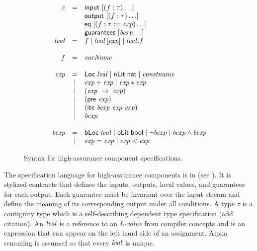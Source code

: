 \begin{figure}
  \[
    \begin{array}{rcl}
      \mathit{c}    & = & \konst{input}\ [(f : \tau)\ldots] \\
                    &   & \konst{output}\ [(f : \tau)\ldots] \\
                    &   & \konst{eq}\; [(f : \tau := \mathit{exp})\ldots] \\
                    &   & \konst{guarantees}\ [\mathit{bexp}\ldots]\\
      
      \lval & = & f \mid \lval \, [ \mathit{exp} ]
                          \mid \lval . f \\ \\

      f             & = & \mathit{varName} \\ \\

      \mathit{exp}  & = & \konst{Loc}\; \lval
                          \mid \konst{nLit}\; \konst{nat}
                          \mid \mathit{constname} \\
                    & | & \mathit{exp} + \mathit{exp}
                          \mid \mathit{exp} * \mathit{exp} \\
                    & | & (\mathit{exp}\ \rightarrow\ \mathit{exp}) \\
                    & | & (\konst{pre}\ \mathit{exp}) \\
                    & | & (\konst{ite}\ \mathit{bexp}\ \mathit{exp}\ \mathit{exp})\\
                    & | & \mathit{bexp} \\ \\
                          
      \mathit{bexp} & = & \konst{bLoc}\; \lval
                          \mid  \konst{bLit}\; \konst{bool}
                          \mid  \neg \mathit{bexp}
                          \mid  \mathit{bexp} \land \mathit{bexp} \\
                    & | & \mathit{exp} = \mathit{exp} 
                    \mid  \mathit{exp} < \mathit{exp}
\end{array}
\]
\caption{Syntax for high-assurance component specifications.}
\label{fig:syntax}
\end{figure}

The specification language for high-assurance components is in (see ). It is stylized contracts that defines the inputs, outputs, local values, and guarantees for each output. Each guarantee must be invariant over the input stream and define the meaning of its corresponding output under all conditions. A type $\tau$ is a contiguity type which is a self-describing dependent type specification (add citation). An $\mathit{lval}$ is a reference to an \emph{L-value} from compiler concepts and is an expression that can appear on the left hand side of an assignment. Alpha renaming is assumed so that every $\mathit{lval}$ is unique.

